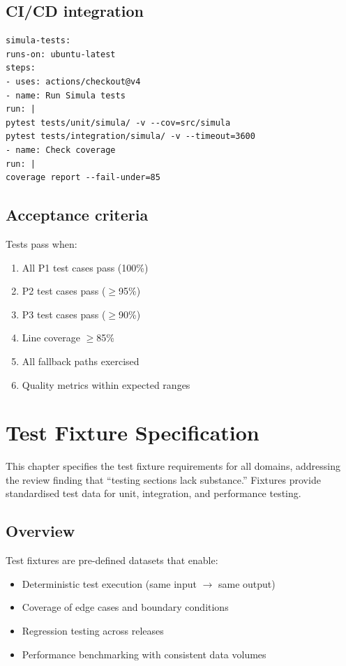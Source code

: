 \documentclass[12pt,a4paper,twoside]{report}
\begin{document}
\section{CI/CD integration}

\begin{lstlisting}[basicstyle=\ttfamily\small,caption={GitHub Actions workflow excerpt.}]
simula-tests:
runs-on: ubuntu-latest
steps:
- uses: actions/checkout@v4
- name: Run Simula tests
run: |
pytest tests/unit/simula/ -v --cov=src/simula
pytest tests/integration/simula/ -v --timeout=3600
- name: Check coverage
run: |
coverage report --fail-under=85
\end{lstlisting}

\section{Acceptance criteria}

Tests pass when:
\begin{enumerate}
\item All P1 test cases pass (100\%)
\item P2 test cases pass ($\geq$95\%)
\item P3 test cases pass ($\geq$90\%)
\item Line coverage $\geq$85\%
\item All fallback paths exercised
\item Quality metrics within expected ranges
\end{enumerate}
\chapter{Test Fixture Specification}\label{ch:test-fixtures}

This chapter specifies the test fixture requirements for all domains, addressing
the review finding that ``testing sections lack substance.'' Fixtures provide
standardised test data for unit, integration, and performance testing.

\section{Overview}

Test fixtures are pre-defined datasets that enable:
\begin{itemize}
\item Deterministic test execution (same input $\rightarrow$ same output)
\item Coverage of edge cases and boundary conditions
\item Regression testing across releases
\item Performance benchmarking with consistent data volumes
\end{itemize}
\end{document}
